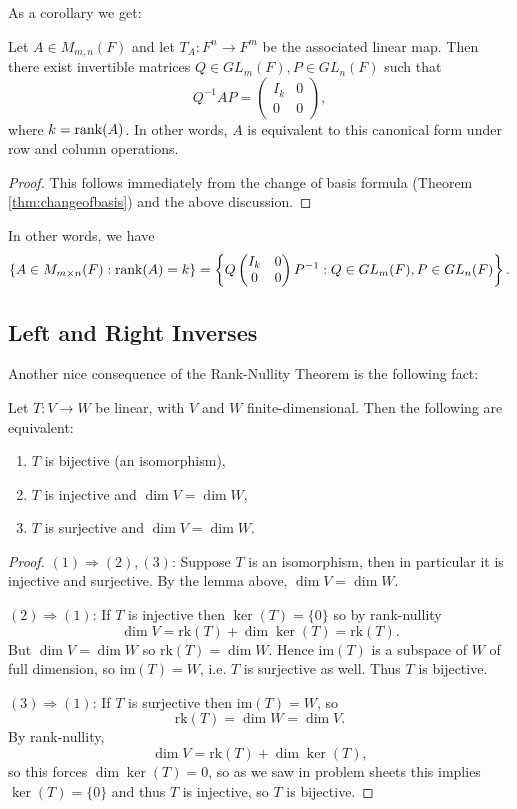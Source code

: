 \documentclass[../linear_algebra_and_groups.tex]{subfiles}
\begin{document}
As a corollary we get:
\begin{corollary}
    \begin{shaded*}
        Let $A\in M_{m,n}(F)$ and let $T_A:F^n\to F^m$ be the associated linear map. Then there exist invertible matrices $Q\in GL_m(F),P\in GL_n(F)$ such that \[Q^{-1}AP=\begin{pmatrix}I_k & 0 \\ 0 & 0\end{pmatrix},\]where $k=\operatorname{rank}(A)$. In other words, $A$ is equivalent to this canonical form under row and column operations.
    \end{shaded*}
\end{corollary}
\begin{proof}
    This follows immediately from the change of basis formula (Theorem \ref{thm:changeofbasis}) and the above discussion.\qedhere
\end{proof}
In other words, we have
\[\{A\in M_{m\times n}(F):\operatorname{rank}(A)=k\}=\left\{Q\begin{pmatrix}I_k & 0 \\ 0 & 0\end{pmatrix}P^{-1}:Q\in GL_m(F),P\in GL_n(F)\right\}.\]

\subsection{Left and Right Inverses}

Another nice consequence of the Rank-Nullity Theorem is the following fact:
\begin{corollary}
\label{cor:samedim}
    \begin{shaded*}
        Let $T:V\to W$ be linear, with $V$ and $W$ finite-dimensional. Then the following are equivalent:
        \begin{enumerate}
            \item[1.] $T$ is bijective (an isomorphism),
            \item[2.] $T$ is injective and $\dim V=\dim W$,
            \item[3.] $T$ is surjective and $\dim V=\dim W$.
        \end{enumerate}
    \end{shaded*}
\end{corollary}
\begin{proof}
    $(1)\Rightarrow(2),(3)$: Suppose $T$ is an isomorphism, then in particular it is injective and surjective. By the lemma above, $\dim V=\dim W$.\par
$(2)\Rightarrow (1)$: If $T$ is injective then $\ker(T)=\{0\}$ so by rank-nullity $$\dim V=\mathrm{rk}(T)+\dim\ker(T)=\mathrm{rk}(T).$$But $\dim V=\dim W$ so $\mathrm{rk}(T)=\dim W$. Hence $\mathrm{im}(T)$ is a subspace of $W$ of full dimension, so $\mathrm{im}(T)=W$, i.e. $T$ is surjective as well. Thus $T$ is bijective.\par
$(3)\Rightarrow (1)$: If $T$ is surjective then $\mathrm{im}(T)=W$, so $$\mathrm{rk}(T)=\dim W=\dim V.$$By rank-nullity, $$\dim V=\mathrm{rk}(T)+\dim\ker(T),$$so this forces $\dim\ker(T)=0$, so as we saw in problem sheets this implies $\ker(T)=\{0\}$ and thus $T$ is injective, so $T$ is bijective. \qedhere
\end{proof}
\end{document}
